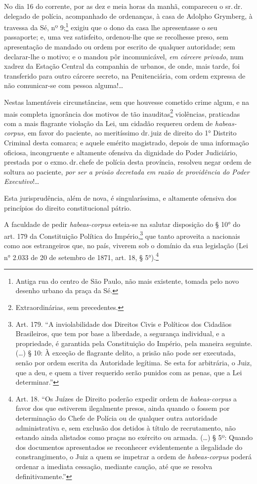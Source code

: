 \asterisc

No dia 16 do corrente, por as dez e meia horas da manhã, compareceu o
sr.\,dr.\,delegado de polícia, acompanhado de ordenanças, à casa de
Adolpho Grymberg, à travessa da Sé, nº 9;\footnote{Antiga rua do
  centro de São Paulo, não mais existente, tomada pelo novo desenho
  urbano da praça da Sé.} exigiu que o dono da casa lhe apresentasse o
seu passaporte; e, uma vez satisfeito, ordenou-lhe que se recolhesse
preso, sem apresentação de mandado ou ordem por escrito de qualquer
autoridade; sem declarar-lhe o motivo; e o mandou pôr incomunicável,
\emph{em cárcere privado}, num xadrez da Estação Central da companhia de
urbanos, de onde, mais tarde, foi transferido para outro cárcere
secreto, na Penitenciária, com ordem expressa de não comunicar-se com
pessoa alguma!\ldots{}

Nestas lamentáveis circunstâncias, sem que houvesse cometido crime
algum, e na mais completa ignorância dos motivos de tão
inauditas\footnote{Extraordinárias, sem precedentes.} violências,
praticadas com a mais flagrante violação da Lei, um cidadão requereu
ordem de \emph{habeas-corpus,} em favor do paciente, ao meritíssimo dr.\,juiz de direito do 1° Distrito Criminal desta comarca; e aquele emérito
magistrado, depois de uma informação oficiosa, incongruente e altamente
ofensiva da dignidade do Poder Judiciário, prestada por o exmo.\,dr.\,chefe de polícia desta província, resolveu negar ordem de soltura ao
paciente, \emph{por ser a prisão decretada em razão de providência do
Poder Executivo}!\ldots{}

Esta jurisprudência, além de nova, é singularíssima, e altamente
ofensiva dos princípios do direito constitucional pátrio.

A faculdade de pedir \emph{habeas-corpus} esteia-se na salutar
disposição do § 10° do art. 179 da Constituição Política do
Império,\footnote{Art. 179. ``A inviolabilidade dos Direitos Civis e
  Políticos dos Cidadãos Brasileiros, que tem por base a liberdade, a
  segurança individual, e a propriedade, é garantida pela Constituição
  do Império, pela maneira seguinte. (\ldots{}) § 10: À exceção de flagrante
  delito, a prisão não pode ser executada, senão por ordem escrita da
  Autoridade legítima. Se esta for arbitrária, o Juiz, que a deu, e quem
  a tiver requerido serão punidos com as penas, que a Lei determinar.''}
que tanto aproveita a nacionais como aos estrangeiros que, no país,
viverem sob o domínio da sua legislação (Lei n° 2.033 de 20 de setembro
de 1871, art. 18, § 5°).\footnote{Art. 18. ``Os Juízes de Direito \label{art18}
  poderão expedir ordem de \emph{habeas-corpus} a favor dos que
  estiverem ilegalmente presos, ainda quando o fossem por determinação
  do Chefe de Polícia ou de qualquer outra autoridade administrativa e,
  sem exclusão dos detidos à título de recrutamento, não estando ainda
  alistados como praças no exército ou armada. (\ldots{}) § 5º: Quando dos
  documentos apresentados se reconhecer evidentemente a ilegalidade do
  constrangimento, o Juiz a quem se impetrar a ordem de
  \emph{habeas-corpus} poderá ordenar a imediata cessação, mediante
  caução, até que se resolva definitivamente.''}

